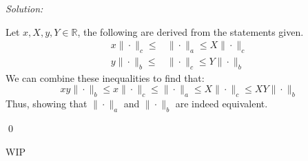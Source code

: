 \documentclass[12pt]{article}
\newenvironment{problem}[2][Problem]{\begin{trivlist}
\item[\hskip \labelsep {\bfseries #1}\hskip \labelsep {\bfseries #2.}]}{\end{trivlist}}
\newenvironment{sol}
    {\emph{Solution:}
    }
    {
    \qed
    }
\newcommand{\R}{\mathbb{R}}
\begin{document}
\newpage
\begin{problem}{2}
    
\end{problem}
\begin{sol}
    Let $x, X, y, Y \in \R$, the following are derived from the statements given.
    \begin{align*}
        x \| \cdot \|_c \leq &\| \cdot \|_a \leq X \| \cdot \|_c\\
        y \| \cdot \|_b \leq &\| \cdot \|_c \leq Y \| \cdot \|_b
    \end{align*}
    We can combine these inequalities to find that:
    \[
    xy \| \cdot \|_b \leq x \| \cdot \|_c \leq \| \cdot \|_a \leq X \| \cdot \|_c \leq  XY \|\cdot\|_b
    \]
    Thus, showing that  $\| \cdot \|_a$ and $\| \cdot \|_b$ are indeed equivalent. 
\end{sol}

\begin{problem}{3}
    WIP
\end{problem}

\begin{problem}{4}
    
\end{problem}

\begin{problem}{5}
    
\end{problem}
\end{document}
